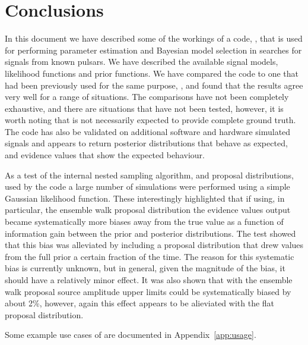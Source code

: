 \section{Conclusions}

In this document we have described some of the workings of a code, \lppenf, that is used for performing parameter estimation and Bayesian model
selection in searches for \gw signals from known pulsars. We have described the available signal models, likelihood functions and prior functions.
We have compared the code to one that had been previously used for the same purpose, \lppef, and found that the results agree very well for a range
of situations. The comparisons have not been completely exhaustive, and there are situations that have not been tested, however, it is worth noting
that \lppe is not necessarily expected to provide complete ground truth. The code has also be validated on additional software and hardware simulated
signals and appears to return posterior distributions that behave as expected, and evidence values that show the expected behaviour.

As a test of the internal nested sampling algorithm, and proposal distributions, used by the code a large number of simulations were performed using
a simple Gaussian likelihood function. These interestingly highlighted that if using, in particular, the ensemble walk proposal distribution the evidence
values output became systematically more biases away from the true value as a function of information gain between the prior and posterior distributions.
The test showed that this bias was alleviated by including a proposal distribution that drew values from the full prior a certain fraction of the time.
The reason for this systematic bias is currently unknown, but in general, given the magnitude of the bias, it should have a relatively minor effect. It was
also shown that with the ensemble walk proposal source amplitude upper limits could be systematically biased by about 2\%, however, again this effect
appears to be alieviated with the flat proposal distribution.

Some example use cases of \lppen are documented in Appendix~\ref{app:usage}.